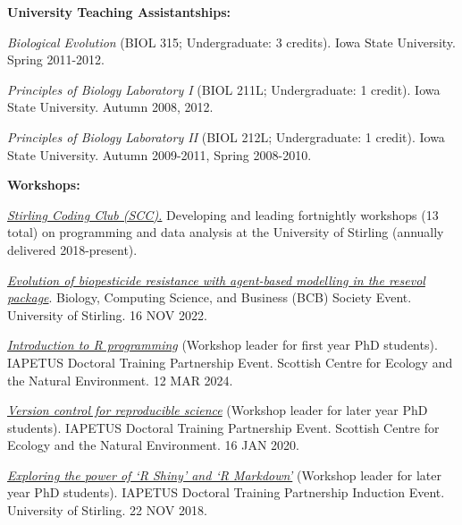 \documentclass[letterpaper]{article}
\renewenvironment{itemize}{
  \begin{list}{}{
    \setlength{\leftmargin}{1.5em}
  }
}{
  \end{list}
}
\begin{document}
\begin{itemize}
\item {\bf University Teaching Assistantships:}
\begin{itemize}
\item[$\bullet$]{{\it Biological Evolution} (BIOL 315; Undergraduate: 3 credits). Iowa State University. Spring 2011-2012.}
\item[$\bullet$]{{\it Principles of Biology Laboratory I} (BIOL 211L; Undergraduate: 1 credit). Iowa State University. Autumn 2008, 2012.}
\item[$\bullet$]{{\it Principles of Biology Laboratory II} (BIOL 212L; Undergraduate: 1 credit). Iowa State University. Autumn 2009-2011, Spring 2008-2010.}
\end{itemize}

\item {\bf Workshops:}
\begin{itemize}
\item[$\bullet$]{{\it \href{https://stirlingcodingclub.github.io/studyGroup}{Stirling Coding Club (SCC).}} Developing and leading fortnightly workshops (13 total) on programming and data analysis at the University of Stirling (annually delivered 2018-present).}
\item[$\bullet$]{{\it \href{http://bradduthie.github.io/talks/BCB_talk.pdf}{Evolution of biopesticide resistance with agent-based modelling in the resevol package}}. Biology, Computing Science, and Business (BCB) Society Event. University of Stirling. 16 NOV 2022.}
\item[$\bullet$]{{\it \href{http://bradduthie.github.io/notes/R_intro_notes.html}{Introduction to R programming}} (Workshop leader for first year PhD students). IAPETUS Doctoral Training Partnership Event. Scottish Centre for Ecology and the Natural Environment. 12 MAR 2024.}
\item[$\bullet$]{{\it \href{https://bradduthie.github.io/version_control/vc_notes.html}{Version control for reproducible science}} (Workshop leader for later year PhD students). IAPETUS Doctoral Training Partnership Event. Scottish Centre for Ecology and the Natural Environment. 16 JAN 2020.}
\item[$\bullet$]{{\it \href{https://bradduthie.github.io/blog/Manuscripts-in-Rmarkdown/}{Exploring the power of `R Shiny' and `R Markdown'}} (Workshop leader for later year PhD students). IAPETUS Doctoral Training Partnership Induction Event. University of Stirling. 22 NOV 2018.}
\end{itemize}

\end{itemize}
\end{document}
